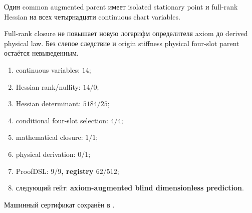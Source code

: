 \begin{theorem}
Один common augmented parent имеет isolated stationary point и full-rank
Hessian на всех четырнадцати continuous chart variables.
\end{theorem}

\begin{nogocriterion}
Full-rank closure не повышает новую логарифм определителя axiom до derived physical law.
Без слепое следствие и origin stiffness physical four-slot parent остаётся
невыведенным.
\end{nogocriterion}

\begin{protocol}\begin{enumerate}
\item continuous variables: \textbf{$14$};
\item Hessian rank/nullity: \textbf{$14/0$};
\item Hessian determinant: \textbf{$5184/25$};
\item conditional four-slot selection: \textbf{$4/4$};
\item mathematical closure: \textbf{$1/1$};
\item physical derivation: \textbf{$0/1$};
\item ProofDSL: \textbf{$9/9$, registry $62/512$};
\item следующий гейт: \textbf{axiom-augmented blind dimensionless prediction}.
\end{enumerate}\end{protocol}

Машинный сертификат сохранён в
.